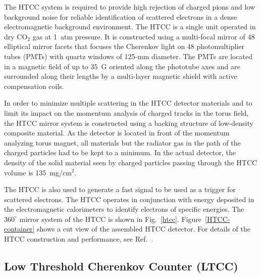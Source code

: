 \documentclass[final,3p]{elsarticle}
\begin{document}
\begin{twocolumn}
The HTCC system is required to provide high rejection of charged pions and low background noise for reliable 
identification of scattered electrons in a dense electromagnetic background environment. The HTCC is a single unit
operated in dry CO$_2$ gas at 1~atm pressure. It is constructed using a multi-focal mirror of 48 elliptical mirror
facets that focuses the Cherenkov light on 48 photomultiplier tubes (PMTs) with quartz windows of 125-mm diameter.
The PMTs are located in a magnetic field of up to 35~G oriented along the phototube axes and are surrounded along
their lengths by a multi-layer magnetic shield with active compensation coils.

In order to minimize multiple scattering in the HTCC detector materials and to limit its impact on the momentum
analysis of charged tracks in the torus field, the HTCC mirror system is constructed using a backing structure of
low-density composite material. As the detector is located in front of the momentum analyzing torus magnet, all
materials but the radiator gas in the path of the charged particles had to be kept to a minimum. In the actual
detector, the density of the solid material seen by charged particles passing through the HTCC volume is
135~mg/cm$^2$. 

The HTCC is also used to generate a fast signal to be used as a trigger for scattered electrons. The HTCC operates
in conjunction with energy deposited in the electromagnetic calorimeters to identify electrons of specific energies.
The $360^\circ$ mirror system of the HTCC is shown in Fig.~\ref{htcc}. Figure~\ref{HTCC-container} shows a cut
view of the assembled HTCC detector. For details of the HTCC construction and performance, see Ref.~\cite{HTCC}.   

\subsection{Low Threshold Cherenkov Counter (LTCC)}


\end{twocolumn}
\end{document}
